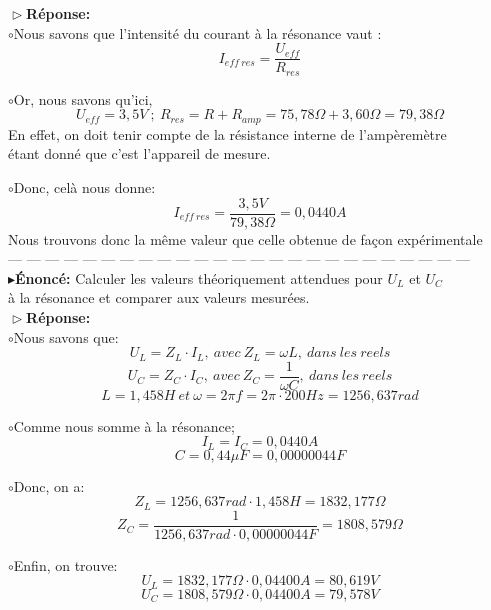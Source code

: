 \documentclass{report}
\begin{document}
\textbf{$\vartriangleright$R\'eponse:} ~~\\

$\circ$Nous savons que l'intensit\'e du courant \`a la r\'esonance vaut :
$$ I_{eff\ res} = \frac{U_{eff}}{R_{res}} $$ 

$\circ$Or, nous savons qu'ici, $$U_{eff} = 3,5V\ ;\ R_{res} = R + R_{amp} = 75,78\Omega + 3,60\Omega = 79,38\Omega$$
\hspace*{0.75cm}En effet, on doit tenir compte de la r\'esistance interne de l'amp\`erem\`etre\\
\hspace*{0.75cm}\'etant donn\'e que c'est l'appareil de mesure. \\

\pagebreak

$\circ$Donc, cel\`a nous donne: $$ I_{eff\ res} = \frac{3,5V}{79,38\Omega} = 0,0440A $$
\hspace*{0.75cm}Nous trouvons donc la m\^eme valeur que celle obtenue de fa\c con exp\'erimentale \\

--- --- --- --- --- --- --- --- --- --- --- --- --- --- --- --- --- --- --- --- --- --- --- --- --- \\

\textbf{$\blacktriangleright$\'Enonc\'e:} Calculer les valeurs th\'eoriquement attendues pour $U_{L}$ et $U_{C}$ \\
\hspace*{2,35cm}\`a la r\'esonance et comparer aux valeurs mesur\'ees. \\

\textbf{$\vartriangleright$R\'eponse:} ~~\\

$\circ$Nous savons que:
$$ U_{L} = Z_{L}\cdot I_{L},\ avec\ Z_{L} = \omega L,\ dans\ les\ reels $$ 
$$ U_{C} = Z_{C}\cdot I_{C},\ avec\ Z_{C} = \frac{1}{\omega C},\ dans\ les\ reels $$
$$ L = 1,458H\ et\ \omega = 2\pi f = 2\pi \cdot 200Hz = 1256,637rad $$

$\circ$Comme nous somme \`a la r\'esonance;
$$ I_{L} = I_{C} = 0,0440A $$
$$ C = 0,44\mu F = 0,00000044F $$

$\circ$Donc, on a:
$$ Z_{L} = 1256,637rad \cdot 1,458H = 1832,177\Omega $$
$$ Z_{C} = \frac{1}{1256,637rad \cdot 0,00000044 F} = 1808,579\Omega $$

$\circ$Enfin, on trouve:
$$ U_{L} = 1832,177\Omega \cdot 0,04400A = 80,619V$$
$$ U_{C} = 1808,579\Omega \cdot 0,04400A = 79,578V$$


\newpage
\end{document}
